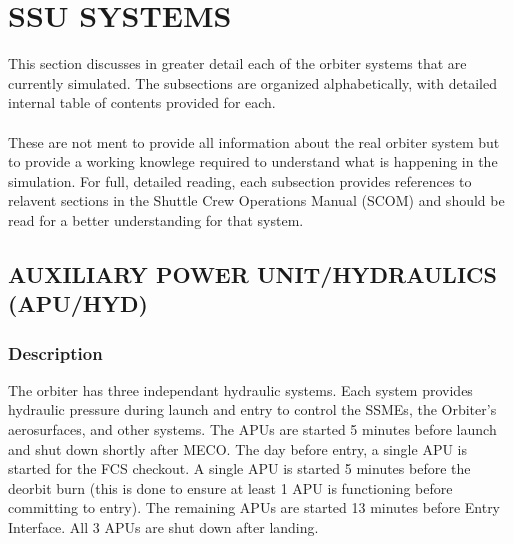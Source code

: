 \documentclass[Space_Shuttle_Ultra_Manual.tex]{subfiles}
\begin{document}
\section{SSU SYSTEMS}
\begin{multicols*}{2}
\renewcommand{\cfttoctitlefont}{\bf}
\localtableofcontents
\noindent
This section discusses in greater detail each of the orbiter systems that are currently simulated. The subsections are organized alphabetically, with detailed internal table of contents provided for each.\\
\\
These are not ment to provide all information about the real orbiter system but to provide a working knowlege required to understand what is happening in the simulation. For full, detailed reading, each subsection provides references to relavent sections in the Shuttle Crew Operations Manual (SCOM) and should be read for a better understanding for that system.
\end{multicols*}

\subsection{AUXILIARY POWER UNIT/HYDRAULICS (APU/HYD)}
\begin{multicols*}{2}
\renewcommand{\cfttoctitlefont}{\bf}
\localtableofcontents
\subsubsection{Description}
The orbiter has three independant hydraulic systems. Each system provides hydraulic pressure during launch and entry to control the SSMEs, the Orbiter's aerosurfaces, and other systems.
The APUs are started 5 minutes before launch and shut down shortly after MECO.
The day before entry, a single APU is started for the FCS checkout.
A single APU is started 5 minutes before the deorbit burn (this is done to ensure at least 1 APU is functioning before committing to entry). The remaining APUs are started 13 minutes before Entry Interface.
All 3 APUs are shut down after landing.
\end{multicols*}
\end{document}
